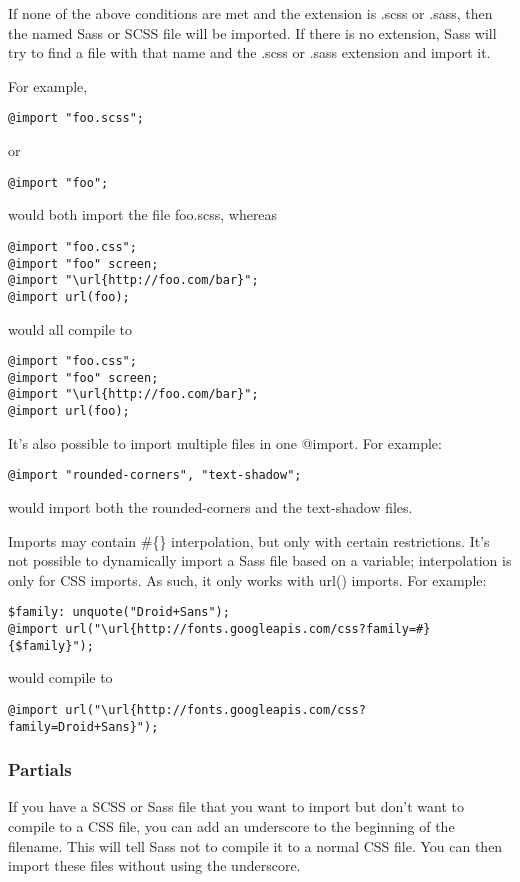 \documentclass[9pt]{article}
\begin{document}
 If none of the above conditions are met and the extension is .scss or .sass, then the named Sass or SCSS file will be imported. If there is no extension, Sass will try to find a file with that name and the .scss or .sass extension and import it.


 For example,
\begin{verbatim}
@import "foo.scss";
\end{verbatim}


 or
\begin{verbatim}
@import "foo";
\end{verbatim}


 would both import the file foo.scss, whereas
\begin{verbatim}
@import "foo.css";
@import "foo" screen;
@import "\url{http://foo.com/bar}";
@import url(foo);
\end{verbatim}


 would all compile to
\begin{verbatim}
@import "foo.css";
@import "foo" screen;
@import "\url{http://foo.com/bar}";
@import url(foo);
\end{verbatim}


 It’s also possible to import multiple files in one @import. For example:
\begin{verbatim}
@import "rounded-corners", "text-shadow";
\end{verbatim}


 would import both the rounded-corners and the text-shadow files.


 Imports may contain \#\{\} interpolation, but only with certain restrictions. It’s not possible to dynamically import a Sass file based on a variable; interpolation is only for CSS imports. As such, it only works with url() imports. For example:
\begin{verbatim}
$family: unquote("Droid+Sans");
@import url("\url{http://fonts.googleapis.com/css?family=#}{$family}");
\end{verbatim}


 would compile to
\begin{verbatim}
@import url("\url{http://fonts.googleapis.com/css?family=Droid+Sans}");
\end{verbatim}
\subsubsection{Partials}


 If you have a SCSS or Sass file that you want to import but don’t want to compile to a CSS file, you can add an underscore to the beginning of the filename. This will tell Sass not to compile it to a normal CSS file. You can then import these files without using the underscore.
\end{document}
